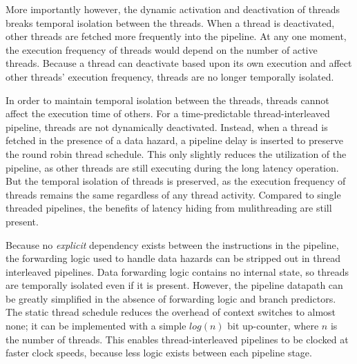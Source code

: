 More importantly however, the dynamic activation and deactivation of threads breaks temporal isolation between the threads.   
When a thread is deactivated, other threads are fetched more frequently into the pipeline.
At any one moment, the execution frequency of threads would depend on the number of active threads. 
Because a thread can deactivate based upon its own execution and affect other threads' execution frequency, threads are no longer temporally isolated.

In order to maintain temporal isolation between the threads, threads cannot affect the execution time of others.
For a time-predictable thread-interleaved pipeline, threads are not dynamically deactivated.
Instead, when a thread is fetched in the presence of a data hazard, a pipeline delay is inserted to preserve the round robin thread schedule.
This only slightly reduces the utilization of the pipeline, as other threads are still executing during the long latency operation.
But the temporal isolation of threads is preserved, as the execution frequency of threads remains the same regardless of any thread activity.  
Compared to single threaded pipelines, the benefits of latency hiding from mulithreading are still present.


Because no \emph{explicit} dependency exists between the instructions in the pipeline, the forwarding logic used to handle data hazards can be stripped out in thread interleaved pipelines. 
Data forwarding logic contains no internal state, so threads are temporally isolated even if it is present.   
However, the pipeline datapath can be greatly simplified in the absence of forwarding logic and branch predictors.
The static thread schedule reduces the overhead of context switches to almost none; it can be implemented with a simple $log(n)$ bit up-counter, where $n$ is the number of threads.     
This enables thread-interleaved pipelines to be clocked at faster clock speeds, because less logic exists between each pipeline stage.
  
